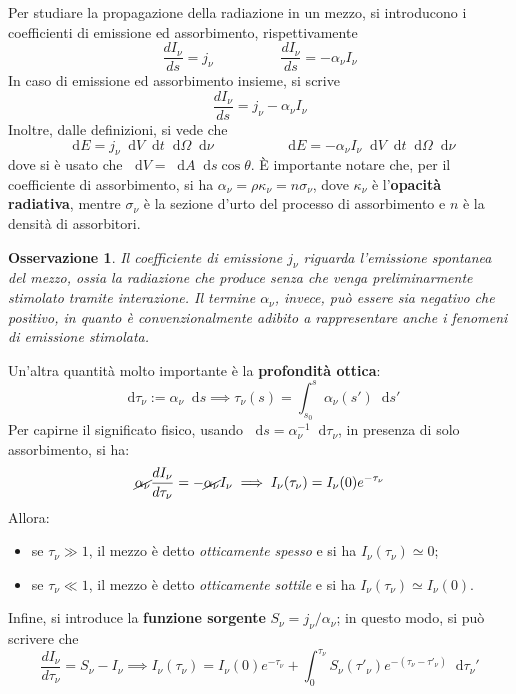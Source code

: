 \documentclass[11pt, a4paper]{scrartcl}
\theoremstyle{style}
\newtheorem{osservazione}{Osservazione}[section]
\theoremstyle{style1}
\newcommand{\dd}{\mathop{}\!\mathrm{d}}
\numberwithin{equation}{subsection}
\begin{document}
Per studiare la propagazione della radiazione in un mezzo, si introducono i coefficienti di emissione ed assorbimento, rispettivamente
\[
\frac{d I_\nu }{d s}  = j_\nu \hspace{2cm} \frac{d I_\nu }{d s}  = - \alpha _\nu I_\nu 
\] 
In caso di emissione ed assorbimento insieme, si scrive
\begin{equation}
\frac{d I_\nu }{d s}  = j_\nu  - \alpha _\nu I_\nu 
\end{equation}
Inoltre, dalle definizioni, si vede che 
\[
	\dd E = j_\nu  \dd V \dd t \dd \Omega \dd \nu \hspace{2cm} \dd E = -\alpha _\nu I_\nu \dd V \dd t \dd \Omega \dd \nu 
\] 
dove si \`e usato che $\dd V = \dd A \dd s \cos \theta $.
\`E importante notare che, per il coefficiente di assorbimento, si ha $\alpha _\nu  = \rho  \kappa _\nu  = n \sigma _\nu $, dove $\kappa _\nu $ \`e l'\textbf{opacit\`a radiativa}, mentre $\sigma _\nu $ \`e la sezione d'urto del processo di assorbimento e $n$ \`e la densit\`a di assorbitori.
\begin{osservazione}
Il coefficiente di emissione $j_\nu $ riguarda l'emissione spontanea del mezzo, ossia la radiazione che produce senza che venga preliminarmente stimolato tramite interazione.
Il termine $\alpha _\nu $, invece, pu\`o essere sia negativo che positivo, in quanto \`e convenzionalmente adibito a rappresentare anche i fenomeni di emissione stimolata.
\end{osservazione}
\noindent Un'altra quantit\`a molto importante \`e la \textbf{profondit\`a ottica}:
\begin{equation}
	\dd \tau _\nu := \alpha _\nu  \dd s\implies \tau _\nu (s) = \int _{s_0} ^s \alpha_\nu  (s') \dd s'
\end{equation}
Per capirne il significato fisico, usando $\dd s= \alpha _\nu ^{-1}\dd \tau _\nu $, in presenza di solo assorbimento, si ha:
\[
	\cancel{\alpha _\nu} \frac{d I_\nu }{d\tau _\nu }  = - \cancel{\alpha _\nu}  I_\nu \implies I_\nu (\tau _\nu ) = I_\nu (0) e^{- \tau _\nu }
\] 
Allora:
\begin{itemize}
	\item se $\tau _\nu  \gg 1$, il mezzo \`e detto \textit{otticamente spesso} e si ha $I_\nu (\tau _\nu ) \simeq 0$;
	\item se $\tau _\nu  \ll 1 $, il mezzo \`e detto \textit{otticamente sottile} e si ha $I_\nu (\tau _\nu )\simeq I_\nu (0)$.
\end{itemize}
Infine, si introduce la \textbf{funzione sorgente} $S_\nu = j_\nu /\alpha _\nu $; in questo modo, si pu\`o scrivere che 
\[
 \frac{d I_\nu }{d \tau _\nu } = S_\nu -I_\nu \implies I_\nu (\tau _\nu ) = I_\nu (0) e^{-\tau _\nu } + \int _0^{\tau _\nu } S_\nu (\tau '_\nu ) e^{-(\tau _\nu -\tau '_\nu )}\dd \tau _\nu '
\] 
\end{document}
